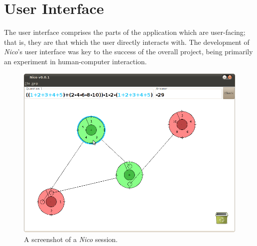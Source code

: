 \documentclass[12pt,twoside,notitlepage,xetex]{report}
\begin{document}
\section{User Interface}%

The user interface comprises the parts of the application which are
user-facing; that is, they are that which the user directly interacts with.
The development of \emph{Nico}'s user interface was key to the success of the
overall project, being primarily an experiment in human-computer interaction.

\begin{center}
\begin{figure}[H]
\begin{center}
\includegraphics[width=\textwidth]{figs/nico_screen_01.png}
\end{center}
\caption{A screenshot of a \emph{Nico} session.}
\end{figure}
\end{center}
\end{document}
